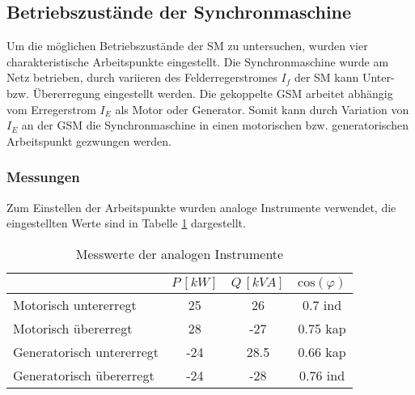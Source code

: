 \subsection{Betriebszustände der Synchronmaschine}
Um die möglichen Betriebszustände der SM zu untersuchen, wurden vier charakteristische Arbeitspunkte eingestellt. Die Synchronmaschine wurde am Netz betrieben, durch variieren des Felderregerstromes $I_f$ der SM kann Unter- bzw. Übererregung eingestellt werden. Die gekoppelte GSM arbeitet abhängig vom Erregerstrom $I_E$ als Motor oder Generator. Somit kann durch Variation von $I_E$ an der GSM die Synchronmaschine in einen motorischen bzw. generatorischen Arbeitspunkt gezwungen werden.
\subsubsection{Messungen}
 Zum Einstellen der Arbeitspunkte wurden analoge Instrumente verwendet, die eingestellten Werte sind in Tabelle \ref{tab:betrzustaende_analoge_messungen} dargestellt.


\begin{table}[!ht]
\centering
\begin{tabular}{|l|c|c|c|}
\hline
                          & $P \,[kW]$ & $Q\, [kVA]$ & $\mathrm{cos}(\varphi)$ \\ \hline
Motorisch untererregt     & 25       & 26        & 0.7 ind                                                 \\ \hline
Motorisch übererregt      & 28       & -27       & 0.75 kap                                                \\ \hline
Generatorisch untererregt & -24      & 28.5      & 0.66 kap                                                \\ \hline
Generatorisch übererregt  & -24      & -28       & 0.76 ind                                                \\ \hline
\end{tabular}
\caption{Messwerte der analogen Instrumente}
\label{tab:betrzustaende_analoge_messungen}
\end{table}

